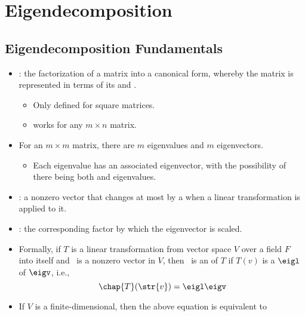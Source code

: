 \chapter{Eigendecomposition}\label{Eigendecomposition}

\section{Eigendecomposition Fundamentals}\label{Eigendecomposition Fundamentals}
\begin{itemize}
  \item {}: the factorization of a matrix into a canonical form, whereby the matrix is represented in terms of its  and .
    \begin{itemize}
      \item Only defined for square matrices. 
      \item \hyperref[Singular Value Decomposition]{} works for any \(m\times n\) matrix.
    \end{itemize}
  \item For an \(m \times m\) matrix, there are \(m\) eigenvalues and \(m\) eigenvectors.
    \begin{itemize}
      \item Each eigenvalue has an associated eigenvector, with the possibility of there being both \hyperref[Eigenvectors of Distinct Eigenvalues]{} and \hyperref[Eigenvectors of Repeated Eigenvalues]{} eigenvalues.
    \end{itemize}
  \item \textbf{}: a nonzero vector that changes at most by a \hyperref[Vector Scalar Multiplication]{} when a linear transformation is applied to it. 
  \item \textbf{}: the corresponding factor by which the eigenvector is scaled.
  \item Formally, if \(T\) is a linear transformation from vector space \(V\) over a field \(F\) into itself and \eigv~is a nonzero vector in \(V\), then \eigv~is an  of \(T\) if \(T(v)\) is a  \(\eigl \) of \(\eigv \), i.e.,
  \[%
  \chap{T}(\str{v}) = \eigl \eigv
  \]%
  \item If \(V\) is a finite-dimensional, then the above equation is equivalent to

\end{itemize}
